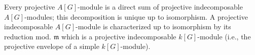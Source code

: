 Every projective $A[G]$-module is a direct sum of projective indecomposable $A[G]$-modules; this decomposition is unique up to isomorphism. A projective indecomposable $A[G]$-module is characterized up to isomorphism by its reduction mod. $\mathfrak{m}$ which is a projective indecomposable $k[G]$-module (i.e., the projective envelope of a simple $k[G]$-module).
